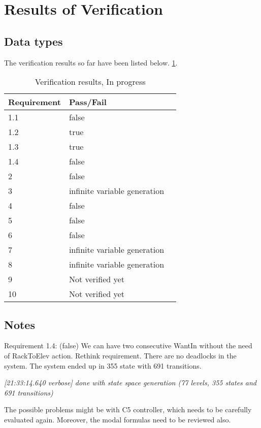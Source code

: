 \section*{Results of Verification}

\subsection*{Data types}
The verification results so far have been listed below. \ref{tab: data_types}.
\begin{table}[h]
\centering
\begin{tabular}{|l|l|l|}\hline
Requirement & Pass/Fail\\\hline
1.1 & false  \\\hline
1.2 & true \\\hline
1.3 & true \\\hline
1.4 & false \\\hline
2 &  false \\\hline
3 &  infinite variable generation\\\hline
4 &  false \\\hline
5 &  false \\\hline
6 &  false \\\hline
7 &  infinite variable generation\\\hline
8 &  infinite variable generation\\\hline
9 &  Not verified yet\\\hline
10 & Not verified yet\\\hline

\end{tabular}
\caption{Verification results, In progress}
\label{tab: data_types}
\end{table}

\subsection*{Notes}
Requirement 1.4: (false) We can have two consecutive WantIn without the need of RackToElev action. Rethink requirement.
There are no deadlocks in the system. The system ended up in 355 state with 691 transitions.
 
\textit{ [21:33:14.640 verbose] done with state space generation (77 levels, 355 states and 691 transitions)}

The possible problems might be with C5 controller, which needs to be carefully evaluated again. Moreover, the modal formulas need to be reviewed also.
